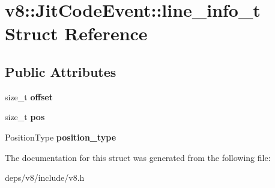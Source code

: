 \hypertarget{structv8_1_1_jit_code_event_1_1line__info__t}{}\section{v8\+:\+:Jit\+Code\+Event\+:\+:line\+\_\+info\+\_\+t Struct Reference}
\label{structv8_1_1_jit_code_event_1_1line__info__t}
\subsection*{Public Attributes}
\begin{DoxyCompactItemize}
\item 
\hypertarget{structv8_1_1_jit_code_event_1_1line__info__t_a084f165114adc594e838ef5fe0c879d6}{}size\+\_\+t {\bfseries offset}\label{structv8_1_1_jit_code_event_1_1line__info__t_a084f165114adc594e838ef5fe0c879d6}

\item 
\hypertarget{structv8_1_1_jit_code_event_1_1line__info__t_aad9a3d593ffa9b647b31b67f60ad19f2}{}size\+\_\+t {\bfseries pos}\label{structv8_1_1_jit_code_event_1_1line__info__t_aad9a3d593ffa9b647b31b67f60ad19f2}

\item 
\hypertarget{structv8_1_1_jit_code_event_1_1line__info__t_ad8a0e551ed2b67096a3fe2f64e2b77a2}{}Position\+Type {\bfseries position\+\_\+type}\label{structv8_1_1_jit_code_event_1_1line__info__t_ad8a0e551ed2b67096a3fe2f64e2b77a2}

\end{DoxyCompactItemize}


The documentation for this struct was generated from the following file\+:\begin{DoxyCompactItemize}
\item 
deps/v8/include/v8.\+h\end{DoxyCompactItemize}
